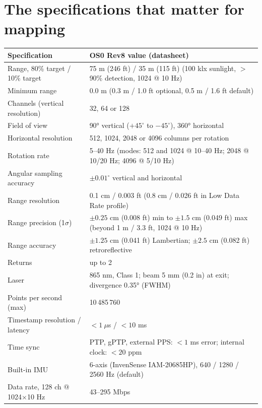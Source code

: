 \section{The specifications that matter for mapping}
\begin{center}\small
\renewcommand{\arraystretch}{1.18}
\begin{tabularx}{\linewidth}{>{\raggedright\arraybackslash}p{4.6cm}X}\toprule
\textbf{Specification} & \textbf{OS0 Rev8 value (datasheet)}\\\midrule
Range, 80\% target / 10\% target & 75 m (246 ft) / 35 m (115 ft) (100 klx sunlight, $>$90\% detection, 1024 @ 10 Hz)\\
Minimum range & 0.0 m (0.3 m / 1.0 ft optional, 0.5 m / 1.6 ft default)\\
Channels (vertical resolution) & 32, 64 or 128\\
Field of view & 90° vertical ($+45^\circ$ to $-45^\circ$), 360° horizontal\\
Horizontal resolution & 512, 1024, 2048 or 4096 columns per rotation\\
Rotation rate & 5--40 Hz (modes: 512 and 1024 @ 10--40 Hz; 2048 @ 10/20 Hz; 4096 @ 5/10 Hz)\\
Angular sampling accuracy & $\pm0.01^\circ$ vertical and horizontal\\
Range resolution & 0.1 cm / 0.003 ft (0.8 cm / 0.026 ft in Low Data Rate profile)\\
Range precision (1$\sigma$) & $\pm0.25$ cm (0.008 ft) min to $\pm1.5$ cm (0.049 ft) max (beyond 1 m / 3.3 ft, 1024 @ 10 Hz)\\
Range accuracy & $\pm1.25$ cm (0.041 ft) Lambertian; $\pm2.5$ cm (0.082 ft) retroreflective\\
Returns & up to 2\\
Laser & 865 nm, Class 1; beam 5 mm (0.2 in) at exit; divergence 0.35° (FWHM)\\
Points per second (max) & 10\,485\,760\\
Timestamp resolution / latency & $<1\ \mu$s / $<10$ ms\\
Time sync & PTP, gPTP, external PPS: $<1$ ms error; internal clock: $<20$ ppm\\
Built-in IMU & 6-axis (InvenSense IAM-20685HP), 640 / 1280 / 2560 Hz (default)\\
Data rate, 128 ch @ 1024$\times$10 Hz & 43--295 Mbps\\\bottomrule
\end{tabularx}\end{center}

